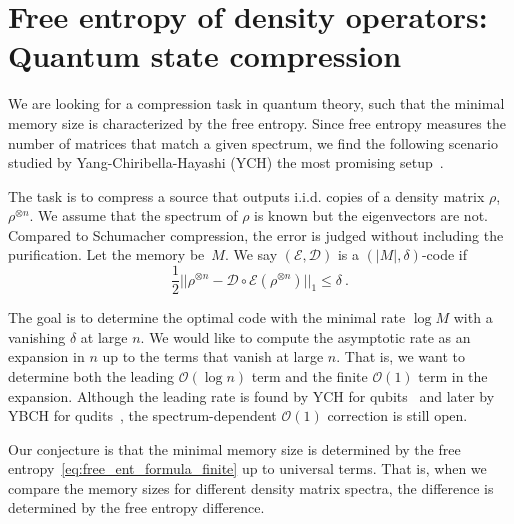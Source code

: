 \documentclass[11pt,letterpaper]{article}
\def\O{\mathcal{O}}
\def\D{\mathcal{D}}
\def\E{\mathcal{E}}
\begin{document}
\section{Free entropy of density operators: Quantum state compression}

We are looking for a compression task in quantum theory, such that the minimal memory size is characterized by the free entropy. Since free entropy measures the number of matrices that match a given spectrum, we find the following scenario studied by Yang-Chiribella-Hayashi (YCH) the most promising setup~\cite{yang2016optimal}.

The task is to compress a source that outputs i.i.d. copies of a density matrix $\rho$, $\rho^{\otimes n}$. We assume that the spectrum of $\rho$ is known but the eigenvectors are not. Compared to Schumacher compression, the error is judged without including the purification. Let the memory be~$M$. We say $(\E,\D)$ is a $(|M|,\delta)$-code if
\begin{equation}\label{eq:error}
    \frac12||\rho^{\otimes n}-\D\circ\E(\rho^{\otimes n})||_1\le\delta\ .
\end{equation} 

The goal is to determine the optimal code with the minimal rate $\log M$ with a vanishing $\delta$ at large $n$. We would like to compute the asymptotic rate as an expansion in $n$ up to the terms that vanish at large $n$. That is, we want to determine both the leading $\O(\log n)$ term and the finite $\O(1)$ term in the expansion. Although the leading rate is found by YCH for qubits~\cite{yang2016optimal} and later by YBCH for qudits~\cite{yang2018compression}, the spectrum-dependent $\O(1)$ correction is still open. 

Our conjecture is that the minimal memory size is determined by the free entropy~\eqref{eq:free_ent_formula_finite} up to universal terms. That is, when we compare the memory sizes for different density matrix spectra, the difference is determined by the free entropy difference.
\end{document}
